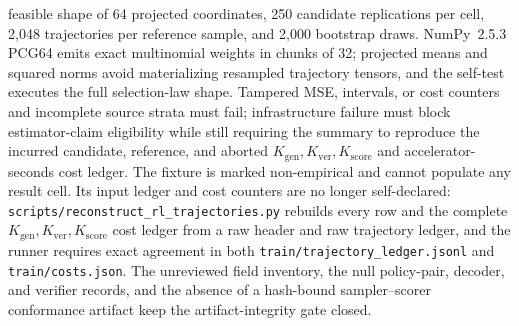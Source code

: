 \documentclass{article}
\begin{document}
feasible shape of 64 projected coordinates, 250 candidate replications per
cell, 2,048 trajectories per reference sample, and 2,000 bootstrap draws.
NumPy~2.5.3 PCG64 emits exact multinomial weights in chunks of 32; projected
means and squared norms avoid materializing resampled trajectory tensors, and
the self-test executes the full selection-law shape. Tampered MSE, intervals, or cost counters
and incomplete source strata must fail; infrastructure failure must block
estimator-claim eligibility while still requiring the summary to reproduce the
incurred candidate, reference, and aborted $K_{\mathrm{gen}},K_{\mathrm{ver}},
K_{\mathrm{score}}$ and accelerator-seconds cost ledger. The fixture is marked non-empirical and cannot
populate any result cell. Its input ledger and cost counters are no longer self-declared:
\texttt{scripts/reconstruct\_rl\_trajectories.py} rebuilds every row and the
complete $K_{\mathrm{gen}},K_{\mathrm{ver}},K_{\mathrm{score}}$ cost ledger from a raw
header and raw trajectory ledger, and the runner requires exact agreement in
both \texttt{train/trajectory\_ledger.jsonl} and \texttt{train/costs.json}.
The unreviewed field inventory, the null policy-pair,
decoder, and verifier records, and the absence of a hash-bound sampler--scorer
conformance artifact keep the artifact-integrity gate closed.
\end{document}
